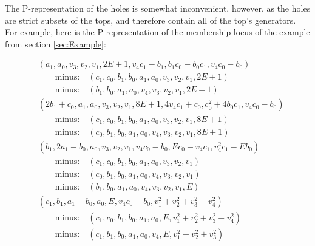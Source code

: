\documentclass{article}
\theoremstyle{definition}
\theoremstyle{plain}
\begin{document}
The P-representation of the holes is somewhat inconvenient, however, as the holes
are strict subsets of the tops, and therefore contain all of the top's generators.
For example, here is the P-representation of the membership locus of the
example from section \ref{sec:Example}:

\begin{subequations}
\begin{align}
& \left(a_{1}, a_{0}, v_{3}, v_{2}, v_{1}, 2 E + 1, v_{4} c_{1} - b_{1}, b_{1} c_{0} - b_{0} c_{1}, v_{4} c_{0} - b_{0}\right) \\
& \qquad\text{minus:}\quad \left(c_{1}, c_{0}, b_{1}, b_{0}, a_{1}, a_{0}, v_{3}, v_{2}, v_{1}, 2 E + 1\right) \nonumber \\
& \qquad\text{minus:}\quad \left(b_{1}, b_{0}, a_{1}, a_{0}, v_{4}, v_{3}, v_{2}, v_{1}, 2 E + 1\right) \nonumber \\
& \left(2 b_{1} + c_{0}, a_{1}, a_{0}, v_{3}, v_{2}, v_{1}, 8 E + 1, 4 v_{4} c_{1} + c_{0}, c_{0}^{2} + 4 b_{0} c_{1}, v_{4} c_{0} - b_{0}\right) \\
& \qquad\text{minus:}\quad \left(c_{1}, c_{0}, b_{1}, b_{0}, a_{1}, a_{0}, v_{3}, v_{2}, v_{1}, 8 E + 1\right) \nonumber \\
& \qquad\text{minus:}\quad \left(c_{0}, b_{1}, b_{0}, a_{1}, a_{0}, v_{4}, v_{3}, v_{2}, v_{1}, 8 E + 1\right) \nonumber \\
& \left(b_{1}, 2 a_{1} - b_{0}, a_{0}, v_{3}, v_{2}, v_{1}, v_{4} c_{0} - b_{0}, E c_{0} - v_{4} c_{1}, v_{4}^{2} c_{1} - E b_{0}\right) \\
& \qquad\text{minus:}\quad \left(c_{1}, c_{0}, b_{1}, b_{0}, a_{1}, a_{0}, v_{3}, v_{2}, v_{1}\right) \nonumber \\
& \qquad\text{minus:}\quad \left(c_{0}, b_{1}, b_{0}, a_{1}, a_{0}, v_{4}, v_{3}, v_{2}, v_{1}\right) \nonumber \\
& \qquad\text{minus:}\quad \left(b_{1}, b_{0}, a_{1}, a_{0}, v_{4}, v_{3}, v_{2}, v_{1}, E\right) \nonumber \\
& \left(c_{1}, b_{1}, a_{1} - b_{0}, a_{0}, E, v_{4} c_{0} - b_{0}, v_{1}^{2} + v_{2}^{2} + v_{3}^{2} - v_{4}^{2}\right) \\
& \qquad\text{minus:}\quad \left(c_{1}, c_{0}, b_{1}, b_{0}, a_{1}, a_{0}, E, v_{1}^{2} + v_{2}^{2} + v_{3}^{2} - v_{4}^{2}\right) \nonumber \\
& \qquad\text{minus:}\quad \left(c_{1}, b_{1}, b_{0}, a_{1}, a_{0}, v_{4}, E, v_{1}^{2} + v_{2}^{2} + v_{3}^{2}\right) \nonumber
\end{align}
\end{subequations}
\end{document}
